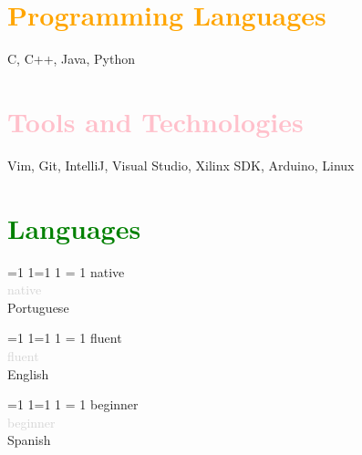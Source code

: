 \documentclass[hidelinks]{article}
\def\printWhiteHeader{0}
\def\printGrayHeader{0}
\begin{document}
\begin{minipage}[t]{4.6cm}
    \section*{\textcolor{orange}{Programming Languages}}
        C, C++, Java, Python
%
    \section*{\textcolor{pink}{Tools and Technologies}}
        Vim, Git, IntelliJ, Visual Studio, Xilinx SDK, Arduino, Linux
%
    \section*{\textcolor{green}{Languages}}
        
        \ifnum\ifnum\printGrayHeader=1 1\else\ifnum\printWhiteHeader=1 1\fi\fi
        = 1
            {\small native} \\
        \else
            \textcolor{lightgray}{native} \\
        \fi
        \null \quad Portuguese

        \ifnum\ifnum\printGrayHeader=1 1\else\ifnum\printWhiteHeader=1 1\fi\fi
        = 1
            {\small fluent} \\
        \else
            \textcolor{lightgray}{fluent} \\
        \fi
        \null \quad English

        \ifnum\ifnum\printGrayHeader=1 1\else\ifnum\printWhiteHeader=1 1\fi\fi
        = 1
            {\small beginner} \\
        \else
            \textcolor{lightgray}{beginner} \\
        \fi
        \null \quad Spanish
\end{minipage}\hfill
%
\hspace{0.6cm}
%
\end{document}
